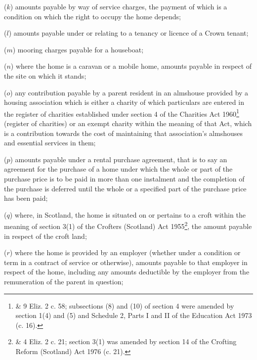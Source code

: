 \documentclass[12pt,a4paper]{article}
\begin{document}
\begin{enumerate}
($k$) 
amounts payable by way of  %
service charges, the payment of which is a condition on which the right to occupy the home depends;

($l$) 
amounts payable  %
under or relating to a tenancy or licence of a Crown tenant;

($m$) mooring charges payable for a houseboat;

($n$) where the home is a caravan or a mobile home, 
amounts payable  %
in respect of the site on which it stands;

($o$) any contribution payable by a parent resident in an almshouse provided by a housing association which is either a charity of which particulars are entered in the register of charities established under section 4 of the Charities Act 1960\footnote{ \& 9 Eliz. 2 c. 58; subsections (8) and (10) of section 4 were amended by section 1(4) and (5) and Schedule 2, Parts I and II of the Education Act 1973 (c. 16).} (register of charities) or an exempt charity within the meaning of that Act, which is a contribution towards the cost of maintaining that association’s almshouses and essential services in them;

($p$) 
amounts payable  %
under a rental purchase agreement, that is to say an agreement for the purchase of a home under which the whole or part of the purchase price is to be paid in more than one instalment and the completion of the purchase is deferred until the whole or a specified part of the purchase price has been paid;

($q$) where, in Scotland, the home is situated on or pertains to a croft within the meaning of section 3(1) of the Crofters (Scotland) Act 1955\footnote{ \& 4 Eliz. 2 c. 21; section 3(1) was amended by section 14 of the Crofting Reform (Scotland) Act 1976 (c. 21).}, the 
amount payable  %
in respect of the croft land;

($r$) where the home is provided by an employer (whether under a condition or term in a contract of service or otherwise), 
amounts payable  %
to that employer in respect of the home, including 
any amounts deductible by the employer  %
from the remuneration of the parent in question;


\end{enumerate}
\end{document}
